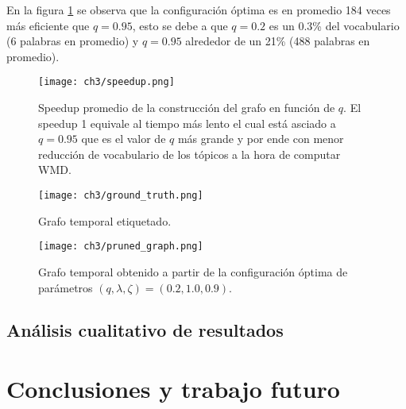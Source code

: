\documentclass[letterpaper,12pt,oneside]{book} %
\begin{document}
En la figura \ref{img:speedup} se observa que la configuración óptima es en promedio 184 veces más eficiente que $q=0.95$, esto se debe a que $q=0.2$ es un 0.3\% del vocabulario (6 palabras en promedio) y $q=0.95$ alrededor de un 21\% (488 palabras en promedio).


\begin{figure}
    \centering
    \texttt{[image: ch3/speedup.png]}
    \caption{Speedup promedio de la construcción del grafo en función de $q$. El speedup 1 equivale al tiempo más lento el cual está asciado a $q=0.95$ que es el valor de $q$ más grande y por ende con menor reducción de vocabulario de los tópicos a la hora de computar WMD.}
    \label{img:speedup}
\end{figure}


\begin{figure}
    \centering
    \texttt{[image: ch3/ground\_truth.png]}
    \caption{Grafo temporal etiquetado.}
    \label{img:ground_truth}
\end{figure}

\begin{figure}
    \centering
    \texttt{[image: ch3/pruned\_graph.png]}
    \caption{Grafo temporal obtenido a partir de la configuración óptima de parámetros $(q, \lambda, \zeta) = (0.2, 1.0, 0.9)$.}
    \label{img:pruned_graph}
\end{figure}

\section{Análisis cualitativo de resultados}

\chapter{Conclusiones y trabajo futuro}





\end{document}
